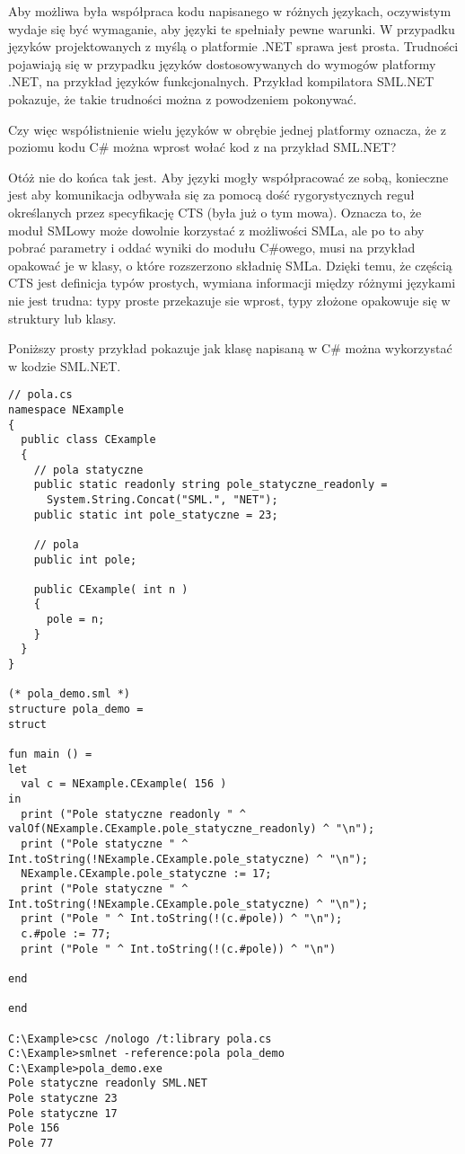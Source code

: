 Aby możliwa była współpraca kodu napisanego w różnych językach, oczywistym wydaje się być wymaganie, aby
języki te spełniały pewne warunki. W przypadku języków projektowanych z myślą o platformie .NET 
sprawa jest prosta. Trudności pojawiają się w przypadku języków dostosowywanych do wymogów platformy .NET,
na przykład języków funkcjonalnych. Przykład kompilatora SML.NET pokazuje, że takie trudności można
z powodzeniem pokonywać.

Czy więc współistnienie wielu języków w obrębie jednej platformy oznacza, że z poziomu kodu C\# można wprost
wołać kod z na przykład SML.NET?

Otóż nie do końca tak jest. Aby języki mogły współpracować ze sobą, konieczne jest aby komunikacja odbywała
się za pomocą dość rygorystycznych reguł określanych przez specyfikację CTS (była już o tym mowa). Oznacza to, że
moduł SMLowy może dowolnie korzystać z możliwości SMLa, ale po to aby pobrać parametry i oddać wyniki
do modułu C\#owego, musi na przykład opakować je w klasy, o które rozszerzono składnię SMLa. Dzięki temu, że
częścią CTS jest definicja typów prostych, wymiana informacji między różnymi językami nie jest trudna: typy
proste przekazuje sie wprost, typy złożone opakowuje się w struktury lub klasy. 

Poniższy prosty przykład pokazuje jak klasę napisaną w C\# można wykorzystać w kodzie SML.NET.

\begin{scriptsize}
\begin{verbatim}
// pola.cs
namespace NExample
{
  public class CExample
  {
    // pola statyczne
    public static readonly string pole_statyczne_readonly = 
      System.String.Concat("SML.", "NET");
    public static int pole_statyczne = 23;

    // pola
    public int pole;

    public CExample( int n ) 
    { 
      pole = n; 
    }
  }
}

(* pola_demo.sml *)
structure pola_demo =
struct

fun main () =
let
  val c = NExample.CExample( 156 )
in
  print ("Pole statyczne readonly " ^ valOf(NExample.CExample.pole_statyczne_readonly) ^ "\n");
  print ("Pole statyczne " ^ Int.toString(!NExample.CExample.pole_statyczne) ^ "\n");
  NExample.CExample.pole_statyczne := 17;
  print ("Pole statyczne " ^ Int.toString(!NExample.CExample.pole_statyczne) ^ "\n");
  print ("Pole " ^ Int.toString(!(c.#pole)) ^ "\n");
  c.#pole := 77;
  print ("Pole " ^ Int.toString(!(c.#pole)) ^ "\n")

end

end

C:\Example>csc /nologo /t:library pola.cs
C:\Example>smlnet -reference:pola pola_demo
C:\Example>pola_demo.exe
Pole statyczne readonly SML.NET
Pole statyczne 23
Pole statyczne 17
Pole 156
Pole 77
\end{verbatim}
\end{scriptsize}

